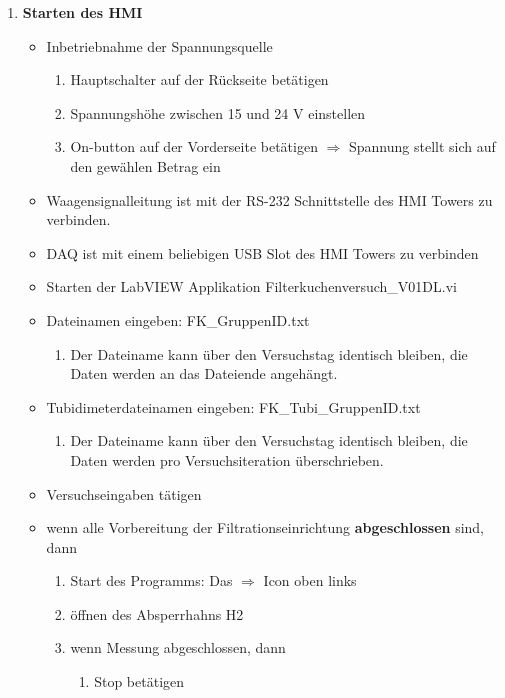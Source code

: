 \begin{enumerate}
\item \textbf{{\Hypatia Starten des HMI}}
	\begin{itemize}
		\item Inbetriebnahme der Spannungsquelle
			\begin{enumerate}[label = \roman*]
			\item Hauptschalter auf der Rückseite betätigen
			\item Spannungshöhe zwischen 15 und 24 V einstellen
			\item On-button auf der Vorderseite betätigen $\Rightarrow$ Spannung stellt sich auf den gewählen Betrag ein
			\end{enumerate}	
	\item Waagensignalleitung ist mit der RS-232 Schnittstelle des HMI Towers zu verbinden.
	\item DAQ ist mit einem beliebigen USB Slot des HMI Towers zu verbinden
	\item Starten der LabVIEW Applikation \: {\Menlo Filterkuchenversuch\_V01DL.vi}
	\item Dateinamen eingeben: FK\_{\Menlo GruppenID.txt}
		\begin{enumerate}[label = -]
		\item Der Dateiname kann über den Versuchstag identisch bleiben, die Daten werden an das Datei\-ende angehängt.
		\end{enumerate}
	\item Tubidimeterdateinamen eingeben: FK\_Tubi\_{\Menlo GruppenID.txt}
		\begin{enumerate}[label = -]
		\item Der Dateiname kann über den Versuchstag identisch bleiben, die Daten werden pro Versuchsiteration überschrieben.
		\end{enumerate}
	\item Versuchseingaben tätigen
	\item wenn alle Vorbereitung der Filtrationseinrichtung \textbf{abgeschlossen} sind, dann
		\begin{enumerate}[label = \Roman*]
		\item Start des Programms: Das $\Rightarrow$ Icon oben links 
		\item öffnen des Absperrhahns H2
		\item wenn Messung abgeschlossen, dann
			\begin{enumerate}[label = --]
			\item Stop betätigen
				\begin{enumerate}[label = -]

\end{enumerate}
\end{enumerate}
\end{enumerate}
\end{itemize}
\end{enumerate}
